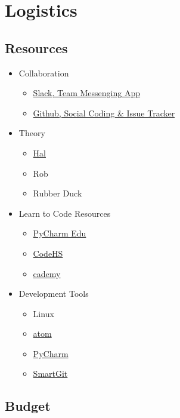 \documentclass[11pt]{article}
\begin{document}
\section{{\color{blue}Logistics}}

\subsection{{\color{blue}Resources}}

\begin{itemize}
	\item Collaboration
		\begin{itemize}
			\item \href{https://slack.com/}{Slack, Team Messenging App}
			\item \href{https://github.com/}{Github, Social Coding \& Issue Tracker}
		\end{itemize}
	\item Theory
		\begin{itemize}
			\item \href{http://baxter-academy.org/faculty#hlarsson}{Hal}
			\item Rob
			\item Rubber Duck
		\end{itemize}
	\item Learn to Code Resources
		\begin{itemize}
			\item \href{https://www.jetbrains.com/pycharm-edu/}{PyCharm Edu}
			\item \href{https://codehs.com/}{CodeHS}
			\item \href{http://www.codecademy.com/}{\underline{c}ademy}
		\end{itemize}
	\item Development Tools
		\begin{itemize}
			\item Linux
			\item \href{https://atom.io/}{atom}
			\item \href{https://www.jetbrains.com/pycharm/}{PyCharm}
			\item \href{http://www.syntevo.com/smartgit/}{SmartGit}
		\end{itemize}
\end{itemize}

\subsection{{\color{blue}Budget}}
\end{document}
